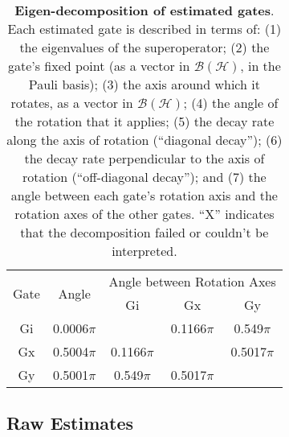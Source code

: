 \documentclass{article}[11pt]
\begin{document}
\begin{table}[h]
\begin{center}
\vspace{2em}
\begin{tabular}[l]{|c|c|c|c|c|}
\hline
\multirow{2}{*}{Gate} & \multirow{2}{*}{Angle} & \multicolumn{3}{c|}{Angle between Rotation Axes} \\ \cline{3-5}
 & & Gi & Gx & Gy \\ \hline
Gi & 0.0006$\pi$ &  & 0.1166$\pi$ & 0.549$\pi$ \\ \hline
Gx & 0.5004$\pi$ & 0.1166$\pi$ &  & 0.5017$\pi$ \\ \hline
Gy & 0.5001$\pi$ & 0.549$\pi$ & 0.5017$\pi$ &  \\ \hline
\end{tabular}

\caption{\textbf{Eigen-decomposition of estimated gates}.  Each estimated gate is described in terms of: (1) the eigenvalues of the superoperator; (2) the gate's fixed point (as a vector in $\mathcal{B}(\mathcal{H})$, in the Pauli basis); (3)  the axis around which it rotates, as a vector in $\mathcal{B}(\mathcal{H})$; (4) the angle of the rotation that it applies; (5) the decay rate along the axis of rotation (``diagonal decay''); (6) the decay rate perpendicular to the axis of rotation (``off-diagonal decay''); and (7) the angle between each gate's rotation axis and the rotation axes of the other gates.  ``X'' indicates that the decomposition failed or couldn't be interpreted. \label{bestGatesetDecompTable}}
\end{center}
\end{table}

\FloatBarrier

\subsection{Raw Estimates}
\end{document}

